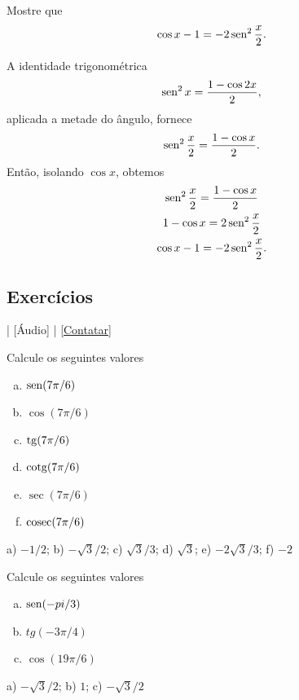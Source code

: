 \begin{exeresol}
  Mostre que
  \begin{equation}
    \cos x - 1 = -2\operatorname{sen}^2 \frac{x}{2}.
  \end{equation}
\end{exeresol}
\begin{resol}
  A identidade trigonométrica
  \begin{equation}
    \operatorname{sen}^2 x = \frac{1 - \cos 2x}{2},
  \end{equation}
  aplicada a metade do ângulo, fornece
  \begin{equation}
    \operatorname{sen}^2 \frac{x}{2} = \frac{1 - \cos x}{2}.
  \end{equation}
  Então, isolando $\cos x$, obtemos
  \begin{gather}
    \operatorname{sen}^2 \frac{x}{2} = \frac{1 - \cos x}{2}\\
    1 - \cos x = 2\operatorname{sen}^2 \frac{x}{2}\\
    \cos x - 1 = -2\operatorname{sen}^2 \frac{x}{2}.
  \end{gather}
\end{resol}

\subsection*{Exercícios}

\begin{flushright}
  [Vídeo] | [Áudio] | \href{https://phkonzen.github.io/notas/contato.html}{[Contatar]}
\end{flushright}

\begin{exer}
  Calcule os seguintes valores
  \begin{enumerate}[a)]
  \item $\operatorname{sen}(7\pi/6)$
  \item $\cos(7\pi/6)$
  \item $\operatorname{tg}(7\pi/6)$
  \item $\operatorname{cotg}(7\pi/6)$
  \item $\sec(7\pi/6)$
  \item $\operatorname{cosec}(7\pi/6)$
  \end{enumerate}
\end{exer}
\begin{resp}
  a) $-1/2$; b) $-\sqrt{3}/2$; c) $\sqrt{3}/3$; d) $\sqrt{3}$; e) $-2\sqrt{3}/3$; f) $-2$
\end{resp}

\begin{exer}
  Calcule os seguintes valores
  \begin{enumerate}[a)]
  \item $\operatorname{sen}(-pi/3)$
  \item $tg(-3\pi/4)$
  \item $\cos(19\pi/6)$
  \end{enumerate}
\end{exer}
\begin{resp}
  a) $-\sqrt{3}/2$; b) $1$; c) $-\sqrt{3}/2$
\end{resp}

